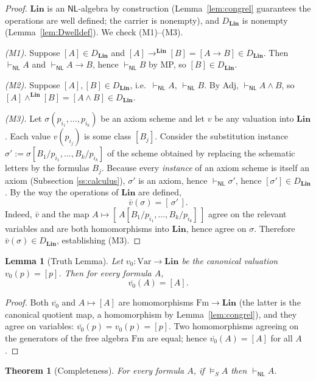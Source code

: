 \documentclass[12pt]{article}
\newtheorem{theorem}{Theorem}
\newtheorem{lemma}{Lemma}
\theoremstyle{definition}
\newcommand{\NL}{\mathsf{NL}}
\newcommand{\prv}{\vdash_{\NL}}
\newcommand{\vld}{\vDash}
\newcommand{\Fm}{\mathrm{Fm}}
\newcommand{\Var}{\mathrm{Var}}
\newcommand{\imp}{\rightarrow}
\newcommand{\Lin}{\mathbf{Lin}}
\begin{document}
\begin{proof}
$\Lin$ is an $\NL$-algebra by construction (Lemma~\ref{lem:congrel} guarantees
the operations are well defined; the carrier is nonempty), and $D_{\Lin}$ is
nonempty (Lemma~\ref{lem:Dwelldef}). We check (M1)--(M3).

\emph{(M1).} Suppose $[A]\in D_{\Lin}$ and $[A]\imp^{\Lin}[B]=[A\imp B]\in
D_{\Lin}$. Then $\prv A$ and $\prv A\imp B$, hence $\prv B$ by MP, so
$[B]\in D_{\Lin}$.

\emph{(M2).} Suppose $[A],[B]\in D_{\Lin}$, i.e.\ $\prv A$, $\prv B$. By Adj,
$\prv A\wedge B$, so $[A]\wedge^{\Lin}[B]=[A\wedge B]\in D_{\Lin}$.

\emph{(M3).} Let $\sigma(p_{i_{1}},\dots,p_{i_{k}})$ be an axiom scheme and let
$v$ be any valuation into $\Lin$. Each value $v(p_{i_{j}})$ is some class
$[B_{j}]$. Consider the substitution instance
$\sigma':=\sigma[B_{1}/p_{i_{1}},\dots,B_{k}/p_{i_{k}}]$ of the scheme obtained
by replacing the schematic letters by the formulas $B_{j}$. Because every
\emph{instance} of an axiom scheme is itself an axiom (Subsection
\ref{ss:calculus}), $\sigma'$ is an axiom, hence $\prv\sigma'$, hence
$[\sigma']\in D_{\Lin}$. By the way the operations of $\Lin$ are defined,
\[
\bar v(\sigma)=[\,\sigma'\,].
\]
Indeed, $\bar v$ and the map $A\mapsto[\,A[B_1/p_{i_1},\dots,B_k/p_{i_k}]\,]$
agree on the relevant variables and are both homomorphisms into $\Lin$, hence
agree on $\sigma$. Therefore $\bar v(\sigma)\in D_{\Lin}$, establishing (M3).
\end{proof}

\begin{lemma}[Truth Lemma]\label{lem:truth}
Let $v_{0}\colon\Var\to\Lin$ be the canonical valuation $v_{0}(p)=[p]$. Then for
every formula $A$,
\[
\overline{v_{0}}(A)=[A].
\]
\end{lemma}

\begin{proof}
Both $\overline{v_{0}}$ and $A\mapsto[A]$ are homomorphisms $\Fm\to\Lin$
(the latter is the canonical quotient map, a homomorphism by
Lemma~\ref{lem:congrel}), and they agree on variables:
$\overline{v_{0}}(p)=v_{0}(p)=[p]$. Two homomorphisms agreeing on the
generators of the free algebra $\Fm$ are equal; hence
$\overline{v_{0}}(A)=[A]$ for all $A$.
\end{proof}

\begin{theorem}[Completeness]\label{thm:complete}
For every formula $A$, if $\vld_{S}A$ then $\prv A$.
\end{theorem}
\end{document}
